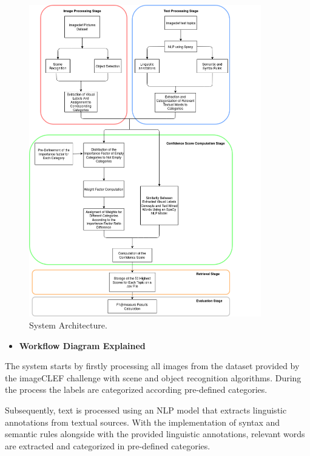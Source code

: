 \begin{figure}[H]
    \centering
    \captionsetup{justification=centering}
    \includegraphics[width = 0.9\textwidth]{Sections/6textprocessing/images/diagram.png}
    \caption{System Architecture.}
    \label{fig:testtopic}
  \end{figure}

\newpage

\begin{itemize}
  \item \textbf{Workflow Diagram Explained}
\end{itemize}

The system starts by firstly processing all images from the dataset provided by the imageCLEF challenge with scene and object recognition algorithms. During the process the labels are categorized according pre-defined categories.

Subsequently, text is processed using an NLP model that extracts linguistic annotations from textual sources.  With the implementation of syntax and semantic rules alongside with the provided linguistic annotations, relevant words are extracted and categorized in pre-defined categories. 

